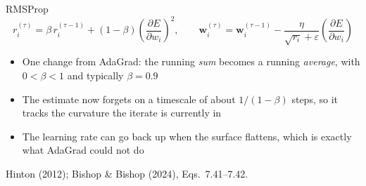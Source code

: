 \documentclass[aspectratio=169, 11pt]{beamer}
\newcommand{\srcline}[1]{%
  \par\vspace{0.25em}%
  {\scriptsize\color{mcMuted}\hfill #1\par}}
\begin{document}
\begin{frame}{RMSProp}
  \vspace{-0.3em}
  \[
    r^{(\tau)}_i = \beta\, r^{(\tau-1)}_i
      + (1-\beta)\left(\frac{\partial E}{\partial w_i}\right)^{2} ,
    \qquad
    \mathbf{w}^{(\tau)}_i = \mathbf{w}^{(\tau-1)}_i
      - \frac{\eta}{\sqrt{r_i} + \varepsilon}
        \left(\frac{\partial E}{\partial w_i}\right)
  \]
  \vspace{-0.5em}
  \begin{itemize}\itemsep0.4em
    \item One change from AdaGrad: the running \emph{sum} becomes a
          running \emph{average}, with $0 < \beta < 1$ and typically
          $\beta = 0.9$
    \item The estimate now forgets on a timescale of about
          $1/(1-\beta)$ steps, so it tracks the curvature the iterate is
          currently in
    \item The learning rate can go back up when the surface flattens,
          which is exactly what AdaGrad could not do
  \end{itemize}
  \srcline{Hinton (2012); Bishop \& Bishop (2024), Eqs.~7.41--7.42.}
\end{frame}
\end{document}
